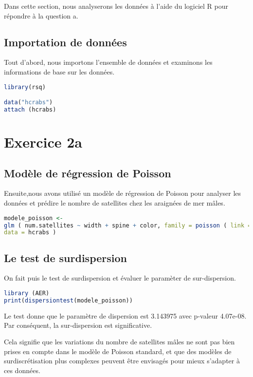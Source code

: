 \documentclass{article}
\begin{document}
Dans cette section, nous analyserons les données à l'aide du logiciel R pour répondre à la question a.

\subsection{Importation de données}

Tout d'abord, nous importons l'ensemble de données et examinons les informations de base sur les données.

\begin{lstlisting}[language=R]
library(rsq)

data("hcrabs")
attach (hcrabs)

\end{lstlisting}

\section{Exercice 2a}

\subsection{Modèle de régression de Poisson}

Ensuite,nous avons utilisé un modèle de régression de Poisson pour analyser les données et prédire le nombre de satellites chez les araignées de mer mâles.

\begin{lstlisting}[language=R]
modele_poisson <- 
glm ( num.satellites ~ width + spine + color, family = poisson ( link = log ) ,
data = hcrabs ) 
\end{lstlisting}

\subsection{Le test de surdispersion}

On fait puis le test de surdispersion et évaluer le paramèter de sur-dispersion.

\begin{lstlisting}[language=R]
library (AER)
print(dispersiontest(modele_poisson))
\end{lstlisting}

Le test donne que le paramètre de dispersion est 3.143975 avec p-valeur 4.07e-08.
Par conséquent, la sur-dispersion est significative.

Cela signifie que les variations du nombre de satellites mâles ne sont pas bien prises en compte dans le modèle de Poisson standard, et que des modèles de surdiscrétisation plus complexes peuvent être envisagés pour mieux s'adapter à ces données.
\end{document}
